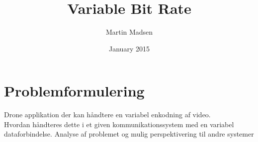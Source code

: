 \documentclass{article}
\title{Variable Bit Rate}
\author{Martin Madsen}
\date{January 2015}
\begin{document}
\maketitle

\section{Problemformulering}
Drone applikation der kan håndtere en variabel enkodning af video.\\

\noindent Hvordan håndteres dette i et given
kommunikationssystem med en variabel dataforbindelse.
Analyse af problemet og mulig perspektivering til andre systemer
\end{document}
